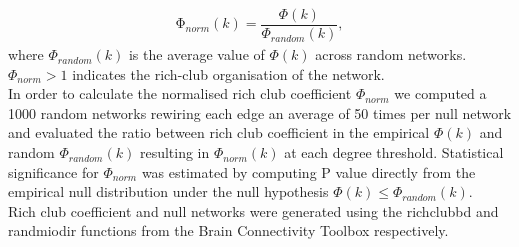 \documentclass[10pt,letterpaper]{article}
\begin{document}
\begin{eqnarray}
	\label{eq:RCnormcoef}
     \mathrm{\Phi_{\textit{norm}}(\textit{k})} = \dfrac{\Phi(\textit{k})}{\Phi_{\textit{random}}(\textit{k})}, 
	 \end{eqnarray}
where $\Phi_{\textit{random}}(\textit{k})$ is the average value of $\Phi(\textit{k})$ across random networks. 
$\Phi_{norm}> 1$ indicates the rich-club organisation of the network.  \\
In order to calculate the normalised rich club coefficient $\Phi_{norm}$ we computed a 1000 random networks rewiring each edge an average of 50 times per null network and evaluated the ratio between rich club coefficient in the empirical $\Phi(k)$ and random $\Phi_{random}(k)$ resulting in $\Phi_{norm}(k)$ at each degree threshold.
Statistical significance for $\Phi_{norm}$ was estimated by computing P value directly from the empirical null distribution under the null hypothesis $\Phi(\textit{k}) \leq \Phi_{\textit{random}}(\textit{k})$. \\
Rich club coefficient and null networks were generated using the rich\textunderscore club\textunderscore bd and randmio\textunderscore dir functions from the Brain Connectivity Toolbox \cite{Rubinov2010} respectively.

\end{document}
